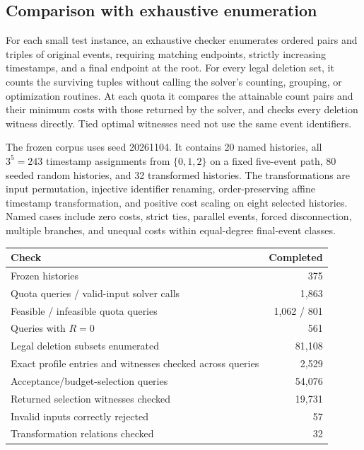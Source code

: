 \subsection{Comparison with exhaustive enumeration}

For each small test instance, an exhaustive checker enumerates ordered pairs
and triples of original events, requiring matching endpoints, strictly
increasing timestamps, and a final endpoint at the root. For every legal
deletion set, it counts the surviving tuples without calling the solver's
counting, grouping, or optimization routines. At each quota it compares
the attainable count pairs and their minimum costs with those returned by
the solver, and checks every deletion witness directly. Tied optimal
witnesses need not use the same event identifiers.

The frozen corpus uses seed 20261104. It contains 20 named histories,
all $3^5=243$ timestamp assignments from $\{0,1,2\}$ on a fixed five-event
path, 80 seeded random histories, and 32 transformed histories. The
transformations are input permutation, injective identifier renaming,
order-preserving affine timestamp transformation, and positive cost scaling
on eight selected histories. Named cases include zero costs, strict ties,
parallel events, forced disconnection, multiple branches, and unequal costs
within equal-degree final-event classes.

\begin{center}
\begin{tabular}{lr}
\toprule
Check & Completed\\
\midrule
Frozen histories & 375\\
Quota queries / valid-input solver calls & 1,863\\
Feasible / infeasible quota queries & 1,062 / 801\\
Queries with $R=0$ & 561\\
Legal deletion subsets enumerated & 81,108\\
Exact profile entries and witnesses checked across queries & 2,529\\
Acceptance/budget-selection queries & 54,076\\
Returned selection witnesses checked & 19,731\\
Invalid inputs correctly rejected & 57\\
Transformation relations checked & 32\\
\bottomrule
\end{tabular}
\end{center}

